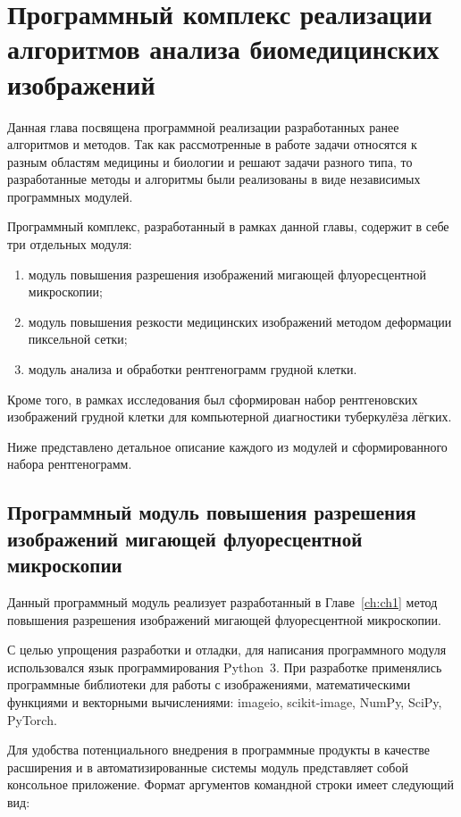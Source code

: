 \chapter{Программный комплекс реализации алгоритмов анализа биомедицинских изображений}\label{ch:ch4}

Данная глава посвящена программной реализации разработанных ранее алгоритмов и методов. Так как рассмотренные в работе задачи относятся к разным областям медицины и биологии и решают задачи разного типа, то разработанные методы и алгоритмы были реализованы в виде независимых программных модулей.

Программный комплекс, разработанный в рамках данной главы, содержит в себе три отдельных модуля:

\begin{enumerate}[beginpenalty=10000]
	\item модуль повышения разрешения изображений мигающей флуоресцентной микроскопии;
	
	\item модуль повышения резкости медицинских изображений методом деформации пиксельной сетки;
	
	\item модуль анализа и обработки рентгенограмм грудной клетки.
\end{enumerate}

Кроме того, в рамках исследования был сформирован набор рентгеновских изображений грудной клетки для компьютерной диагностики туберкулёза лёгких.

Ниже представлено детальное описание каждого из модулей и сформированного набора рентгенограмм.
 
\section{Программный модуль повышения разрешения изображений мигающей флуоресцентной микроскопии}

Данный программный модуль реализует разработанный в Главе~\ref{ch:ch1} метод повышения разрешения изображений мигающей флуоресцентной микроскопии.

С целью упрощения разработки и отладки, для написания программного модуля использовался язык программирования Python~3. При разработке применялись программные библиотеки для работы с изображениями, математическими функциями и векторными вычислениями: imageio, scikit-image, NumPy, SciPy, PyTorch.

Для удобства потенциального внедрения в программные продукты в качестве расширения и в автоматизированные системы модуль представляет собой консольное приложение. Формат аргументов командной строки имеет следующий вид:

